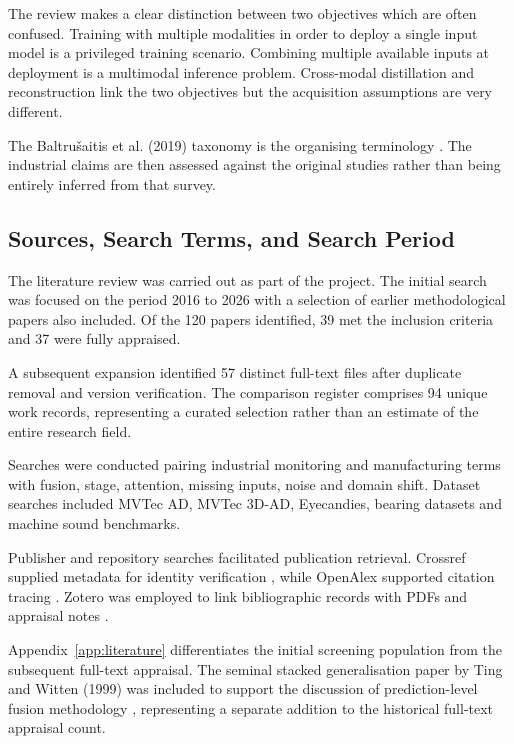 The review makes a clear distinction between two objectives which are often confused. Training with
multiple modalities in order to deploy a single input model is a privileged training scenario.
Combining multiple available inputs at deployment is a multimodal inference problem. Cross-modal
distillation and reconstruction link the two objectives but the acquisition assumptions are very
different.

The Baltrušaitis et al. (2019) taxonomy is the organising terminology
\citep{Baltrusaitis2019Multimodal}. The industrial claims are then assessed against the original
studies rather than being entirely inferred from that survey.

\subsection{Sources, Search Terms, and Search Period}

The literature review was carried out as part of the project. The initial search was focused on the
period 2016 to 2026 with a selection of earlier methodological papers also included. Of the 120
papers identified, 39 met the inclusion criteria and 37 were fully appraised.

A subsequent expansion identified 57 distinct full-text files after duplicate removal and version
verification. The comparison register comprises 94 unique work records, representing a curated
selection rather than an estimate of the entire research field.

Searches were conducted pairing industrial monitoring and manufacturing terms with fusion, stage,
attention, missing inputs, noise and domain shift. Dataset searches included MVTec AD, MVTec 3D-AD,
Eyecandies, bearing datasets and machine sound benchmarks.

Publisher and repository searches facilitated publication retrieval. Crossref supplied metadata for
identity verification \citep{Crossref2020REST}, while OpenAlex supported citation tracing
\citep{Priem2022OpenAlex}. Zotero was employed to link bibliographic records with PDFs and appraisal
notes \citep{Zotero2026}.

Appendix~\ref{app:literature} differentiates the initial screening population from the subsequent
full-text appraisal. The seminal stacked generalisation paper by Ting and Witten (1999) was included
to support the discussion of prediction-level fusion methodology \citep{Ting1999Issues},
representing a separate addition to the historical full-text appraisal count.

